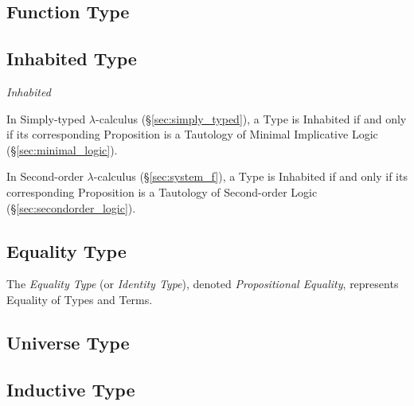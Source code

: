\subsection{Function Type}\label{sec:function_type}

\subsection{Inhabited Type}\label{sec:inhabited_type}

\emph{Inhabited}

In Simply-typed $\lambda$-calculus (\S\ref{sec:simply_typed}), a Type
is Inhabited if and only if its corresponding Proposition is a
Tautology of Minimal Implicative Logic (\S\ref{sec:minimal_logic}).

In Second-order $\lambda$-calculus (\S\ref{sec:system_f}), a
Type is Inhabited if and only if its corresponding Proposition is a
Tautology of Second-order Logic (\S\ref{sec:secondorder_logic}).



\subsection{Equality Type}\label{sec:equality_type}

The \emph{Equality Type} (or \emph{Identity Type}), denoted
\emph{Propositional Equality}, represents Equality of Types and Terms.



\subsection{Universe Type}\label{sec:universe_type}

\subsection{Inductive Type}\label{sec:inductive_type}

